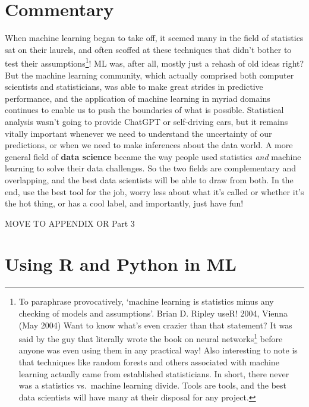 \documentclass[
  letterpaper,
]{krantz}
\DeclareRobustCommand{\href}[2]{#2\footnote{\url{#1}}}
\begin{document}
\section{Commentary}\label{commentary-1}

When machine learning began to take off, it seemed many in the field of
statistics sat on their laurels, and often scoffed at these techniques
that didn't bother to test their assumptions\footnote{To paraphrase
  provocatively, `machine learning is statistics minus any checking of
  models and assumptions'. Brian D. Ripley useR! 2004, Vienna (May 2004)
  Want to know what's even crazier than that statement? It was said by
  the guy that literally
  \href{https://www.cambridge.org/core/books/pattern-recognition-and-neural-networks/4E038249C9BAA06C8F4EE6F044D09C5C}{wrote
  the book on neural networks} before anyone was even using them in any
  practical way! Also interesting to note is that techniques like random
  forests and others associated with machine learning actually came from
  established statisticians. In short, there never was a statistics
  vs.~machine learning divide. Tools are tools, and the best data
  scientists will have many at their disposal for any project.}! ML was,
after all, mostly just a rehash of old ideas right? But the machine
learning community, which actually comprised both computer scientists
and statisticians, was able to make great strides in predictive
performance, and the application of machine learning in myriad domains
continues to enable us to push the boundaries of what is possible.
Statistical analysis wasn't going to provide ChatGPT or self-driving
cars, but it remains vitally important whenever we need to understand
the uncertainty of our predictions, or when we need to make inferences
about the data world. A more general field of \textbf{data science}
became the way people used statistics \emph{and} machine learning to
solve their data challenges. So the two fields are complementary and
overlapping, and the best data scientists will be able to draw from
both. In the end, use the best tool for the job, worry less about what
it's called or whether it's the hot thing, or has a cool label, and
importantly, just have fun!

MOVE TO APPENDIX OR Part 3

\section{Using R and Python in ML}\label{using-r-and-python-in-ml}
\end{document}
